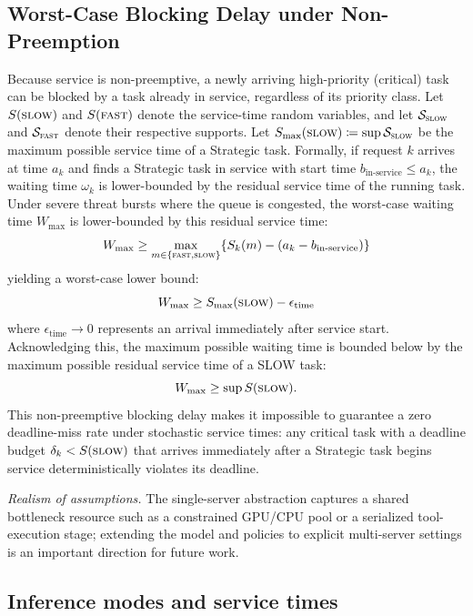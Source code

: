 \documentclass[fleqn,12pt,lineno]{wlpeerj}
\begin{document}
\subsection{Worst-Case Blocking Delay under Non-Preemption}
\label{sec:worst_case_blocking}
Because service is non-preemptive, a newly arriving high-priority (critical) task can be blocked by a task already in service, regardless of its priority class. Let $S(\textsc{slow})$ and $S(\textsc{fast})$ denote the service-time random variables, and let $\mathcal{S}_{\textsc{slow}}$ and $\mathcal{S}_{\textsc{fast}}$ denote their respective supports. Let $S_{\max}(\textsc{slow}) \coloneqq \sup \mathcal{S}_{\textsc{slow}}$ be the maximum possible service time of a Strategic task. Formally, if request $k$ arrives at time $a_k$ and finds a Strategic task in service with start time $b_{\text{in-service}} \le a_k$, the waiting time $\omega_k$ is lower-bounded by the residual service time of the running task. Under severe threat bursts where the queue is congested, the worst-case waiting time $W_{\max}$ is lower-bounded by this residual service time:
\begin{equation}
W_{\max} \ge \max_{m \in \{\textsc{fast}, \textsc{slow}\}} \{S_k(m) - (a_k - b_{\text{in-service}})\}
\end{equation}
yielding a worst-case lower bound:
\begin{equation}
W_{\max} \ge S_{\max}(\textsc{slow}) - \epsilon_{\text{time}}
\end{equation}
where $\epsilon_{\text{time}} \to 0$ represents an arrival immediately after service start. Acknowledging this, the maximum possible waiting time is bounded below by the maximum possible residual service time of a SLOW task:
\begin{equation}
W_{\max} \ge \sup S(\textsc{slow}).
\end{equation}
This non-preemptive blocking delay makes it impossible to guarantee a zero deadline-miss rate under stochastic service times: any critical task with a deadline budget $\delta_k < S(\textsc{slow})$ that arrives immediately after a Strategic task begins service deterministically violates its deadline.

\emph{Realism of assumptions.} The single-server abstraction captures a shared bottleneck resource such as a constrained GPU/CPU pool or a serialized tool-execution stage; extending the model and policies to explicit multi-server settings is an important direction for future work.

\subsection{Inference modes and service times}
\label{sec:modes_service}
\end{document}
